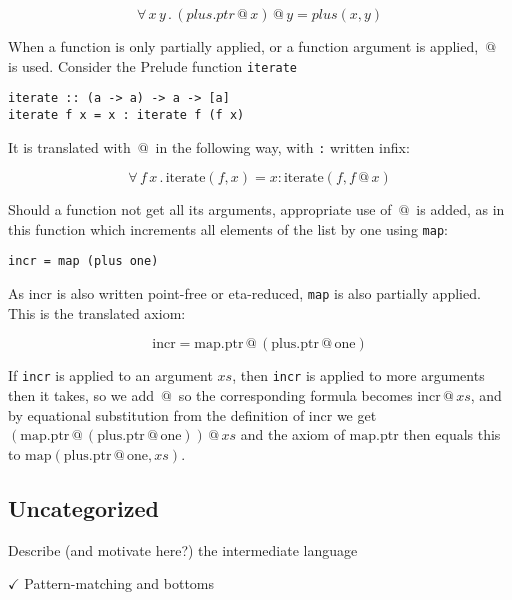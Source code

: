 \begin{equation}
\forall \, x \, y \, . \, (plus.ptr \, @ \,  x) \, @ \,  y = plus(x,y)
\end{equation}

When a function is only partially applied, or a function argument is
applied, $\, @ \, $ is used. Consider the Prelude function \verb;iterate;

\begin{verbatim}
iterate :: (a -> a) -> a -> [a]
iterate f x = x : iterate f (f x)
\end{verbatim}

It is translated with $\, @ \, $ in the following way, with \verb;:; written infix:

\begin{equation}
\forall \, f \, x \, . \, \mathrm{iterate}(f,x) = x : \mathrm{iterate}(f,f \, @ \,  x)
\end{equation}

Should a function not get all its arguments, appropriate use of $\, @ \, $ is
added, as in this function which increments all elements of the list
by one using \verb;map;:

\begin{verbatim}
incr = map (plus one)
\end{verbatim}

As incr is also written point-free or eta-reduced, \verb;map; is also
partially applied. This is the translated axiom:

\begin{equation}
\mathrm{incr} = \mathrm{map.ptr} \, @ \,  (\mathrm{plus.ptr} \, @ \,  \mathrm{one})
\end{equation}

If \verb;incr; is applied to an argument $xs$, then \verb;incr; is
applied to more arguments then it takes, so we add $\, @ \,$ so the
corresponding formula becomes $\mathrm{incr} \, @ \, xs$, and by
equational substitution from the definition of incr we get
$(\mathrm{map.ptr} \, @ \, (\mathrm{plus.ptr} \, @ \, \mathrm{one}))
\, @ \, xs$ and the axiom of $\mathrm{map.ptr}$ then equals this to
$\mathrm{map}(\mathrm{plus.ptr} \, @ \, \mathrm{one},xs)$.

\subsection{Uncategorized}

Describe (and motivate here?) the intermediate language

$\checkmark$ Pattern-matching and bottoms


